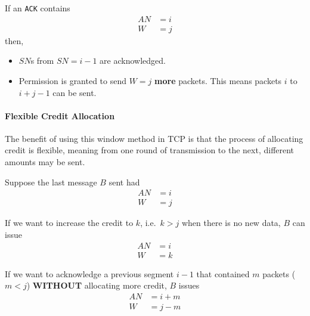 If an \texttt{ACK} contains
\begin{align*}
  AN &= i \\
  W &= j
\end{align*}
then,
\begin{itemize}[noitemsep]
\item $SN$s from $SN = i - 1$ are acknowledged.
\item Permission is granted to send $W = j$ \textbf{more} packets.
  This means packets $i$ to $i + j - 1$ can be sent.
\end{itemize}

\paragraph{Flexible Credit Allocation}\label{par:TCP_Flexible_Credit_Allocation}
The benefit of using this window method in TCP is that the process of allocating credit is flexible, meaning from one round of transmission to the next, different amounts may be sent.

Suppose the last message $B$ sent had
\begin{align*}
  AN &= i \\
  W &= j
\end{align*}

If we want to increase the credit to $k$, i.e.\ $k > j$ when there is no new data, $B$ can issue
\begin{align*}
  AN &= i \\
  W &= k
\end{align*}

If we want to acknowledge a previous segment $i-1$ that contained $m$ packets ($m < j$) \textbf{WITHOUT} allocating more credit, $B$ issues
\begin{align*}
  AN &= i + m \\
  W &= j - m
\end{align*}

